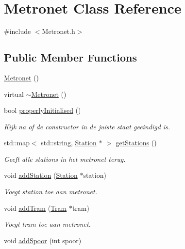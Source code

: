 \hypertarget{class_metronet}{}\section{Metronet Class Reference}
\label{class_metronet}


{\ttfamily \#include $<$Metronet.\+h$>$}

\subsection*{Public Member Functions}
\begin{DoxyCompactItemize}
\item 
\hyperlink{class_metronet_abdd205c39857ed1aabd104a6886cad45}{Metronet} ()
\item 
virtual \hyperlink{class_metronet_afa96be4bf66f8d7dcf3f40a7487d2ea7}{$\sim$\+Metronet} ()
\item 
bool \hyperlink{class_metronet_a3d2adce29a947f162924279b766de645}{properly\+Initialised} ()
\begin{DoxyCompactList}\small\item\em Kijk na of de constructor in de juiste staat geeindigd is. \end{DoxyCompactList}\item 
std\+::map$<$ std\+::string, \hyperlink{class_station}{Station} $\ast$ $>$ \hyperlink{class_metronet_a756f8163c67c4e559699b9c508fb1346}{get\+Stations} ()
\begin{DoxyCompactList}\small\item\em Geeft alle stations in het metronet terug. \end{DoxyCompactList}\item 
void \hyperlink{class_metronet_ac7f4069e577cd4dddb1e166923df3ecb}{add\+Station} (\hyperlink{class_station}{Station} $\ast$station)
\begin{DoxyCompactList}\small\item\em Voegt station toe aan metronet. \end{DoxyCompactList}\item 
void \hyperlink{class_metronet_a3a01132772f4a367d83af40a3c02e224}{add\+Tram} (\hyperlink{class_tram}{Tram} $\ast$tram)
\begin{DoxyCompactList}\small\item\em Voegt tram toe aan metronet. \end{DoxyCompactList}\item 
void \hyperlink{class_metronet_a0422381a8d7f32a915e0ad966af43627}{add\+Spoor} (int spoor)

\end{DoxyCompactItemize}
